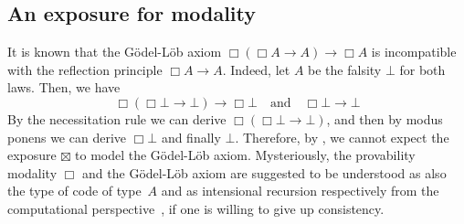 \documentclass[a4paper,UKenglish,numberwithinsect,cleveref,thm-restate,draft]{lipics-v2021}
\numberwithin{equation}{section}
\theoremstyle{definition}
\theoremstyle{plain}
\begin{document}
%

\subsection{An exposure for \texorpdfstring{\GL}{GL} modality}
It is known that the Gödel-Löb axiom $\Box(\Box A \to A) \to \Box A$ is incompatible with the reflection principle $\Box A \to A$.
Indeed, let $A$ be the falsity $\bot$ for both laws. Then, we have
\[
  \Box(\Box \bot \to \bot) \to \Box \bot
  \quad\text{and}\quad
  \Box \bot \to \bot
\]
By the necessitation rule we can derive $\Box (\Box \bot \to \bot)$, and then by modus ponens we can derive $\Box \bot$ and finally $\bot$.
Therefore, by , we cannot expect the exposure $\boxtimes$ to model the Gödel-Löb axiom.
Mysteriously, the provability modality $\Box$ and the Gödel-Löb axiom are suggested to be understood as also the type of code of type~$A$ and as intensional recursion respectively from the computational perspective~\cite{Kavvos2017b}, if one is willing to give up consistency.
\end{document}
